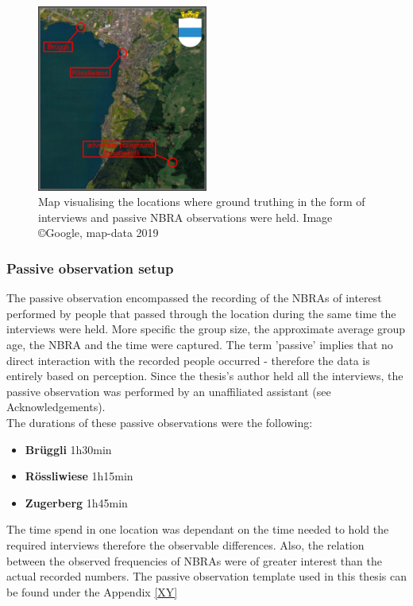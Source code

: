 \begin{figure}[h]
       \centering
       \includegraphics[width=0.5\textwidth, left]{img/interviews_locations}
       \caption{Map visualising the locations where ground truthing in the form of interviews and passive NBRA observations were held. Image \copyright Google, map-data 2019}
       \label{fig:locations_ground_truthing}
\end{figure}

\subsubsection{Passive observation setup} \label{passive_observation_setup}
The passive observation encompassed the recording of the NBRAs of interest performed by people that passed through the location during the same time the interviews were held. More specific the group size, the approximate average group age, the NBRA and the time were captured. The term 'passive' implies that no direct interaction with the recorded people occurred - therefore the data is entirely based on perception.
Since the thesis's author held all the interviews, the passive observation was performed by an unaffiliated assistant (see Acknowledgements).\\
The durations of these passive observations were the following:
\begin{itemize}
    \item \textbf{Br\"uggli} 1h30min
    \item \textbf{R\"ossliwiese} 1h15min
    \item \textbf{Zugerberg} 1h45min
\end{itemize}
The time spend in one location was dependant on the time needed to hold the required interviews therefore the observable differences. Also, the relation between the observed frequencies of NBRAs were of greater interest than the actual recorded numbers.
The passive observation template used in this thesis can be found under the Appendix \ref{XY}

